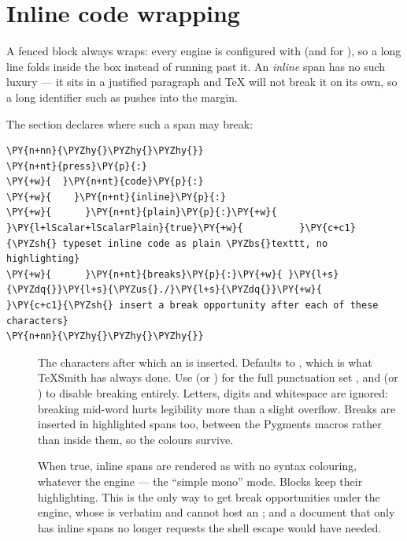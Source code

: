 \documentclass[a4paper,twoside]{article}
\begin{document}
\section{Inline code wrapping}
A fenced block always wraps: every engine is configured with  (and  for ), so a long line folds inside the box instead of running past it. An \emph{inline} span has no such luxury --- it sits in a justified paragraph and \TeX{} will not break it on its own, so a long identifier such as  pushes into the margin.

The  section declares where such a span may break:
\begin{tscode}[lang=yaml, engine=pygments]
\begin{Verbatim}[commandchars=\\\{\},breaklines, breakanywhere, commandchars=\\\{\}]
\PY{n+nn}{\PYZhy{}\PYZhy{}\PYZhy{}}
\PY{n+nt}{press}\PY{p}{:}
\PY{+w}{  }\PY{n+nt}{code}\PY{p}{:}
\PY{+w}{    }\PY{n+nt}{inline}\PY{p}{:}
\PY{+w}{      }\PY{n+nt}{plain}\PY{p}{:}\PY{+w}{ }\PY{l+lScalar+lScalarPlain}{true}\PY{+w}{          }\PY{c+c1}{\PYZsh{} typeset inline code as plain \PYZbs{}texttt, no highlighting}
\PY{+w}{      }\PY{n+nt}{breaks}\PY{p}{:}\PY{+w}{ }\PY{l+s}{\PYZdq{}}\PY{l+s}{\PYZus{}./}\PY{l+s}{\PYZdq{}}\PY{+w}{        }\PY{c+c1}{\PYZsh{} insert a break opportunity after each of these characters}
\PY{n+nn}{\PYZhy{}\PYZhy{}\PYZhy{}}
\end{Verbatim}
\end{tscode}
\begin{description}
\item[{}] The characters after which an  is inserted. Defaults to \tscodeinline{-\allowbreak{}}, which is what TeXSmith has always done. Use  (or ) for the full punctuation set , and  (or ) to disable breaking entirely. Letters, digits and whitespace are ignored: breaking mid-word hurts legibility more than a slight overflow. Breaks are inserted in highlighted spans too, between the Pygments macros rather than inside them, so the colours survive.
\item[{}] When true, inline spans are rendered as  with no syntax colouring, whatever the engine --- the \enquote{simple mono} mode. Blocks keep their highlighting. This is the only way to get break opportunities under the  engine, whose  is verbatim and cannot host an ; and a document that only has inline spans no longer requests the shell escape  would have needed.
\end{description}
\end{document}
